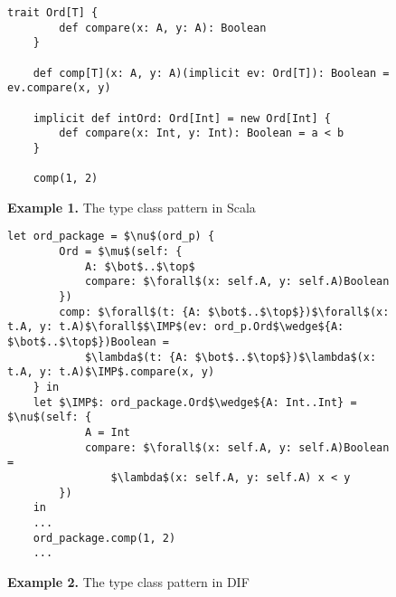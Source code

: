 \begin{figure*}[h]
\begin{lstlisting}[mathescape]
    trait Ord[T] {
        def compare(x: A, y: A): Boolean
    }

    def comp[T](x: A, y: A)(implicit ev: Ord[T]): Boolean = ev.compare(x, y)

    implicit def intOrd: Ord[Int] = new Ord[Int] {
        def compare(x: Int, y: Int): Boolean = a < b
    }

    comp(1, 2)
\end{lstlisting}
\caption*{\textbf{Example 1.} The type class pattern in Scala}
\end{figure*}

\begin{figure*}[h]
\begin{lstlisting}[mathescape]
    let ord_package = $\nu$(ord_p) {
        Ord = $\mu$(self: {
            A: $\bot$..$\top$
            compare: $\forall$(x: self.A, y: self.A)Boolean
        })
        comp: $\forall$(t: {A: $\bot$..$\top$})$\forall$(x: t.A, y: t.A)$\forall$$\IMP$(ev: ord_p.Ord$\wedge${A: $\bot$..$\top$})Boolean =
            $\lambda$(t: {A: $\bot$..$\top$})$\lambda$(x: t.A, y: t.A)$\IMP$.compare(x, y)
    } in
    let $\IMP$: ord_package.Ord$\wedge${A: Int..Int} = $\nu$(self: {
            A = Int
            compare: $\forall$(x: self.A, y: self.A)Boolean =
                $\lambda$(x: self.A, y: self.A) x < y
        })
    in
    ...
    ord_package.comp(1, 2)
    ...
\end{lstlisting}
\caption*{\textbf{Example 2.} The type class pattern in DIF}
\end{figure*}
